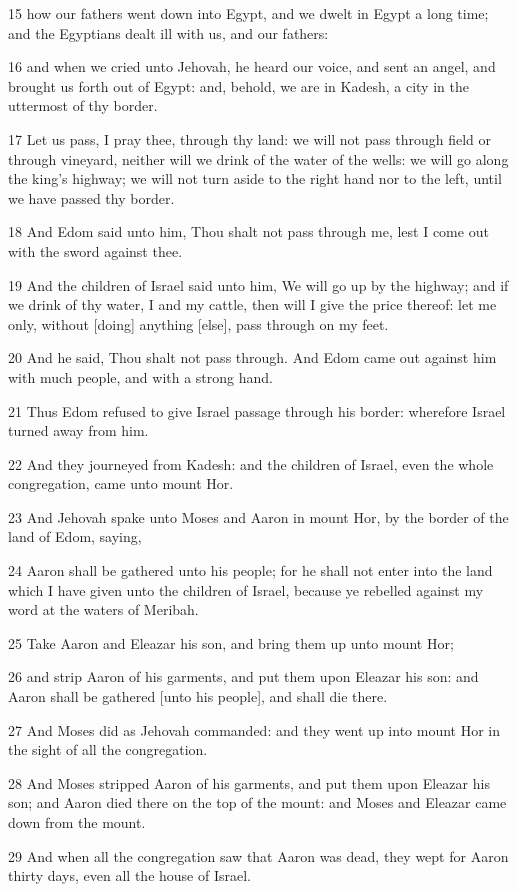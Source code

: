 \par 15 how our fathers went down into Egypt, and we dwelt in Egypt a long time; and the Egyptians dealt ill with us, and our fathers:
\par 16 and when we cried unto Jehovah, he heard our voice, and sent an angel, and brought us forth out of Egypt: and, behold, we are in Kadesh, a city in the uttermost of thy border.
\par 17 Let us pass, I pray thee, through thy land: we will not pass through field or through vineyard, neither will we drink of the water of the wells: we will go along the king's highway; we will not turn aside to the right hand nor to the left, until we have passed thy border.
\par 18 And Edom said unto him, Thou shalt not pass through me, lest I come out with the sword against thee.
\par 19 And the children of Israel said unto him, We will go up by the highway; and if we drink of thy water, I and my cattle, then will I give the price thereof: let me only, without [doing] anything [else], pass through on my feet.
\par 20 And he said, Thou shalt not pass through. And Edom came out against him with much people, and with a strong hand.
\par 21 Thus Edom refused to give Israel passage through his border: wherefore Israel turned away from him.
\par 22 And they journeyed from Kadesh: and the children of Israel, even the whole congregation, came unto mount Hor.
\par 23 And Jehovah spake unto Moses and Aaron in mount Hor, by the border of the land of Edom, saying,
\par 24 Aaron shall be gathered unto his people; for he shall not enter into the land which I have given unto the children of Israel, because ye rebelled against my word at the waters of Meribah.
\par 25 Take Aaron and Eleazar his son, and bring them up unto mount Hor;
\par 26 and strip Aaron of his garments, and put them upon Eleazar his son: and Aaron shall be gathered [unto his people], and shall die there.
\par 27 And Moses did as Jehovah commanded: and they went up into mount Hor in the sight of all the congregation.
\par 28 And Moses stripped Aaron of his garments, and put them upon Eleazar his son; and Aaron died there on the top of the mount: and Moses and Eleazar came down from the mount.
\par 29 And when all the congregation saw that Aaron was dead, they wept for Aaron thirty days, even all the house of Israel.

